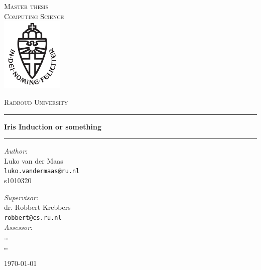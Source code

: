 \documentclass[11pt,a4paper]{report}
\begin{document}
\renewcommand{\sectionautorefname}{Section}
\renewcommand{\subsectionautorefname}{Section}
\renewcommand{\chapterautorefname}{Chapter}

\begin{titlepage}
  \begin{center}
    \textsc{\LARGE Master thesis\\Computing Science}\\[1.5cm]
    \includegraphics[height=100pt]{logo}

    \vspace{0.4cm}
    \textsc{\Large Radboud University}\\[1cm]
    \hrule
    \vspace{0.4cm}
    \textbf{\huge Iris Induction or something}\\[0.4cm]
    \hrule
    \vspace{2cm}
    \begin{minipage}[t]{0.45\textwidth}
      \begin{flushleft} \large
        \textit{Author:}\\
        Luko van der Maas\\
        \texttt{luko.vandermaas@ru.nl}\\
        s1010320
      \end{flushleft}
    \end{minipage}
    \begin{minipage}[t]{0.45\textwidth}
      \begin{flushright} \large
        \textit{Supervisor:}\\
        dr. Robbert Krebbers\\
        \texttt{robbert@cs.ru.nl}\\[1.3cm]
        \textit{Assessor:}\\
        \dots\\
        \texttt{\dots}
      \end{flushright}
    \end{minipage}
    \vfill
    {\large \today}
  \end{center}
\end{titlepage}
\end{document}

